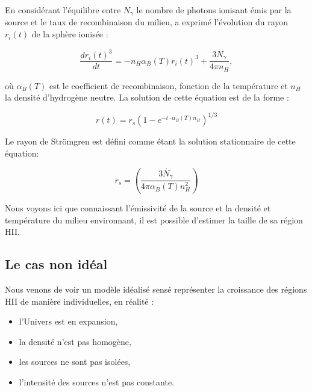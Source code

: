 En considérant l'équilibre entre $\dot{N_\gamma}$ le nombre de photons ionisant émis par la source et le taux de recombinaison du milieu, \cite{stromgren_physical_1939} a exprimé l'évolution du rayon  $r_i(t)$ de la sphère ionisée :

\begin{equation}
\frac{dr_i(t)^3}{dt} = -n_H \alpha_B(T)r_i (t)^3 + \frac{3 \dot{N_\gamma} }{4 \pi n_H},
\end{equation}

où $\alpha_B(T)$ est le coefficient de recombinaison, fonction de la température et $n_H$ la densité d'hydrogène neutre.
La solution de cette équation est de la forme :

\begin{equation}
r(t) = r_s \left( 1 - e^{-t\cdot \alpha_B(T) n_H } \right)^{1/3}
\end{equation}

%

Le rayon de Strömgren est défini comme étant la solution stationnaire de cette équation:

\begin{equation}
r_s = \left( \frac{3 \dot{N_\gamma} }{4 \pi \alpha_B(T) n_H^2} \right)
\end{equation}

Nous voyons ici que connaissant l'émissivité de la source et la densité et température du milieu environnant, il est possible d'estimer la taille de sa région HII.

\subsection{Le cas non idéal}

Nous venons de voir un modèle idéalisé sensé représenter la croissance des régions HII de manière individuelles, en réalité : 
\begin{itemize}
\item l'Univers est en expansion,
\item la densité n'est pas homogène,%
\item les sources ne sont pas isolées,
\item l'intensité des sources n'est pas constante. %
\end{itemize}

